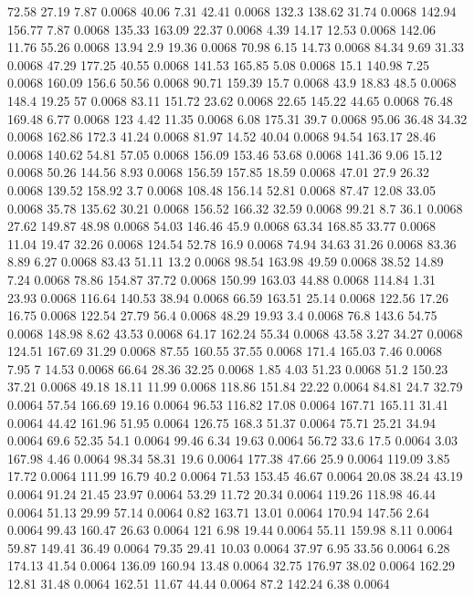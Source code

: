 72.58	27.19	7.87	0.0068
40.06	7.31	42.41	0.0068
132.3	138.62	31.74	0.0068
142.94	156.77	7.87	0.0068
135.33	163.09	22.37	0.0068
4.39	14.17	12.53	0.0068
142.06	11.76	55.26	0.0068
13.94	2.9	19.36	0.0068
70.98	6.15	14.73	0.0068
84.34	9.69	31.33	0.0068
47.29	177.25	40.55	0.0068
141.53	165.85	5.08	0.0068
15.1	140.98	7.25	0.0068
160.09	156.6	50.56	0.0068
90.71	159.39	15.7	0.0068
43.9	18.83	48.5	0.0068
148.4	19.25	57	0.0068
83.11	151.72	23.62	0.0068
22.65	145.22	44.65	0.0068
76.48	169.48	6.77	0.0068
123	4.42	11.35	0.0068
6.08	175.31	39.7	0.0068
95.06	36.48	34.32	0.0068
162.86	172.3	41.24	0.0068
81.97	14.52	40.04	0.0068
94.54	163.17	28.46	0.0068
140.62	54.81	57.05	0.0068
156.09	153.46	53.68	0.0068
141.36	9.06	15.12	0.0068
50.26	144.56	8.93	0.0068
156.59	157.85	18.59	0.0068
47.01	27.9	26.32	0.0068
139.52	158.92	3.7	0.0068
108.48	156.14	52.81	0.0068
87.47	12.08	33.05	0.0068
35.78	135.62	30.21	0.0068
156.52	166.32	32.59	0.0068
99.21	8.7	36.1	0.0068
27.62	149.87	48.98	0.0068
54.03	146.46	45.9	0.0068
63.34	168.85	33.77	0.0068
11.04	19.47	32.26	0.0068
124.54	52.78	16.9	0.0068
74.94	34.63	31.26	0.0068
83.36	8.89	6.27	0.0068
83.43	51.11	13.2	0.0068
98.54	163.98	49.59	0.0068
38.52	14.89	7.24	0.0068
78.86	154.87	37.72	0.0068
150.99	163.03	44.88	0.0068
114.84	1.31	23.93	0.0068
116.64	140.53	38.94	0.0068
66.59	163.51	25.14	0.0068
122.56	17.26	16.75	0.0068
122.54	27.79	56.4	0.0068
48.29	19.93	3.4	0.0068
76.8	143.6	54.75	0.0068
148.98	8.62	43.53	0.0068
64.17	162.24	55.34	0.0068
43.58	3.27	34.27	0.0068
124.51	167.69	31.29	0.0068
87.55	160.55	37.55	0.0068
171.4	165.03	7.46	0.0068
7.95	7	14.53	0.0068
66.64	28.36	32.25	0.0068
1.85	4.03	51.23	0.0068
51.2	150.23	37.21	0.0068
49.18	18.11	11.99	0.0068
118.86	151.84	22.22	0.0064
84.81	24.7	32.79	0.0064
57.54	166.69	19.16	0.0064
96.53	116.82	17.08	0.0064
167.71	165.11	31.41	0.0064
44.42	161.96	51.95	0.0064
126.75	168.3	51.37	0.0064
75.71	25.21	34.94	0.0064
69.6	52.35	54.1	0.0064
99.46	6.34	19.63	0.0064
56.72	33.6	17.5	0.0064
3.03	167.98	4.46	0.0064
98.34	58.31	19.6	0.0064
177.38	47.66	25.9	0.0064
119.09	3.85	17.72	0.0064
111.99	16.79	40.2	0.0064
71.53	153.45	46.67	0.0064
20.08	38.24	43.19	0.0064
91.24	21.45	23.97	0.0064
53.29	11.72	20.34	0.0064
119.26	118.98	46.44	0.0064
51.13	29.99	57.14	0.0064
0.82	163.71	13.01	0.0064
170.94	147.56	2.64	0.0064
99.43	160.47	26.63	0.0064
121	6.98	19.44	0.0064
55.11	159.98	8.11	0.0064
59.87	149.41	36.49	0.0064
79.35	29.41	10.03	0.0064
37.97	6.95	33.56	0.0064
6.28	174.13	41.54	0.0064
136.09	160.94	13.48	0.0064
32.75	176.97	38.02	0.0064
162.29	12.81	31.48	0.0064
162.51	11.67	44.44	0.0064
87.2	142.24	6.38	0.0064
